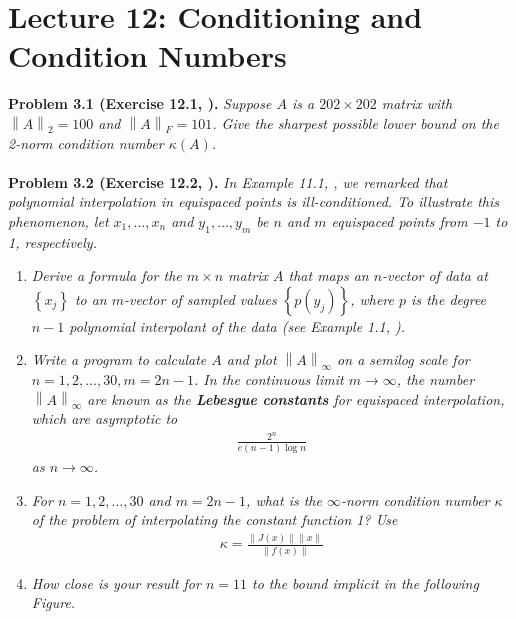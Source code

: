 \documentclass[a4paper,oneside]{book}
\numberwithin{equation}{chapter}
\begin{document}
\section{Lecture 12: Conditioning and Condition Numbers}
\textbf{Problem 3.1 (Exercise 12.1, \cite{1}).} \textit{Suppose $A$ is a $202\times 202$ matrix with ${\left\| A \right\|_2} = 100$ and ${\left\| A \right\|_F} = 101$. Give the sharpest possible lower bound on the 2-norm condition number $\kappa \left(A\right)$.}\\
\\
\textbf{Problem 3.2 (Exercise 12.2, \cite{1}).} \textit{In Example 11.1, \cite{1}, we remarked that polynomial interpolation in equispaced points is ill-conditioned. To illustrate this phenomenon, let $x_1,\ldots,x_n$ and $y_1,\ldots,y_m$ be $n$ and $m$ equispaced points from $-1$ to 1, respectively.}
\begin{enumerate}
\item \textit{Derive a formula for the $m\times n$ matrix $A$ that maps an $n$-vector of data at $\left\{ {{x_j}} \right\}$ to an $m$-vector of sampled values $\left\{ {p\left( {{y_j}} \right)} \right\}$, where $p$ is the degree $n-1$ polynomial interpolant of the data (see Example 1.1, \cite{1}).} 
\item \textit{Write a program to calculate $A$ and plot ${\left\| A \right\|_\infty }$ on a semilog scale for $n=1,2,\ldots,30,m=2n-1$. In the continuous limit $m\to \infty$, the number ${\left\| A \right\|_\infty }$ are known as the \textbf{Lebesgue constants} for equispaced interpolation, which are asymptotic to}
\begin{align}
\frac{{{2^n}}}{{e\left( {n - 1} \right)\log n}}
\end{align}
\textit{as $n \to \infty$.}
\item \textit{For $n=1,2,\ldots,30$ and $m=2n-1$, what is the $\infty$-norm condition number $\kappa$ of the problem of interpolating the constant function 1? Use}
\begin{align}
\kappa  = \frac{{\left\| {J\left( x \right)} \right\|\left\| x \right\|}}{{\left\| {f\left( x \right)} \right\|}}
\end{align}
\item \textit{How close is your result for $n=11$ to the bound implicit in the following Figure.} 
\end{enumerate}
\end{document}
